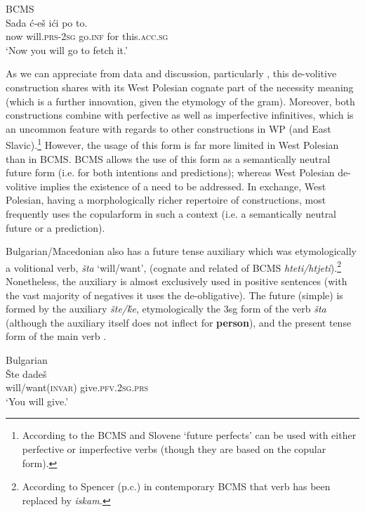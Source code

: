 \documentclass[output=paper,colorlinks,citecolor=brown]{langscibook}
\begin{document}
\ea \label{ex:roncero:23}
    BCMS \citep[186]{Gvozdanovic1995}\\
    \gll Sada ć-eš ići po to.\\
    now will.\textsc{prs-2sg} go.\textsc{inf} for this.\textsc{acc.sg}\\
    \glt ‘Now you will go to fetch it.’
\z

As we can appreciate from  data and discussion, particularly , this de-volitive construction shares with its West Polesian cognate part of the necessity meaning (which is a further innovation, given the etymology of the gram). Moreover, both constructions combine with perfective as well as imperfective infinitives, which is an uncommon feature with regards to other constructions in WP (and East Slavic).\footnote{According to \citet[186--187, 192]{Gvozdanovic1995} the BCMS and Slovene ‘future perfects’ can be used with either perfective or imperfective verbs (though they are based on the copular form).} However, the usage of this form is far more limited in West Polesian than in BCMS. BCMS allows the use of this form as a semantically neutral future form (i.e. for both intentions and predictions); whereas West Polesian de-volitive implies the existence of a need to be addressed. In exchange, West Polesian, having a morphologically richer repertoire of constructions, most frequently uses the copularform in such a context (i.e. a semantically neutral future or a prediction).

Bulgarian/Macedonian also has a future tense auxiliary which was etymologically a volitional verb, \textit{šta} ‘will/want’, (cognate and related of BCMS \textit{hteti/htjeti}).\footnote{According to Spencer (p.c.) in contemporary BCMS that verb has been replaced by \textit{iskam.}} Nonetheless, the auxiliary is almost exclusively used in positive sentences (with the vast majority of negatives it uses the de-obligative). The future (simple) is formed by the auxiliary \textit{šte}\textit{/ḱe}, etymologically the 3sg form of the verb \textit{šta} (although the auxiliary itself does not inflect for \textbf{person}), and the present tense form of the main verb \citep[209]{Kuteva1995}.


\ea \label{ex:roncero:24}
    Bulgarian \citep[209]{Kuteva1995}\\
    \gll Šte dadeš\\
    will/want(\textsc{invar}) give.\textsc{pfv.2sg.prs}\\
    \glt ‘You will give.’
\z
\end{document}
